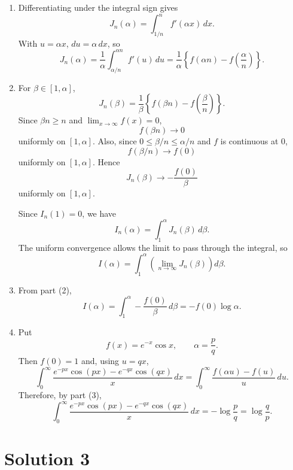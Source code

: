 \documentclass[10pt,a4paper]{article}
\begin{document}
\begin{enumerate}
  \item Differentiating under the integral sign gives
        \[
          J_n(\alpha)
          =
          \int_{1/n}^{n} f'(\alpha x)\,dx.
        \]
        With $u=\alpha x$, $du=\alpha\,dx$, so
        \[
          J_n(\alpha)
          =
          \frac1\alpha
          \int_{\alpha/n}^{\alpha n}f'(u)\,du
          =
          \boxed{
          \frac1\alpha
          \left\{f(\alpha n)-f\left(\frac{\alpha}{n}\right)\right\}.}
        \]

  \item For $\beta\in[1,\alpha]$,
        \[
          J_n(\beta)
          =
          \frac1\beta
          \left\{f(\beta n)-f\left(\frac{\beta}{n}\right)\right\}.
        \]
        Since $\beta n\geq n$ and $\lim_{x\to\infty}f(x)=0$,
        \[
          f(\beta n)\to 0
        \]
        uniformly on $[1,\alpha]$. Also, since $0\leq \beta/n\leq \alpha/n$ and $f$ is continuous at $0$,
        \[
          f(\beta/n)\to f(0)
        \]
        uniformly on $[1,\alpha]$. Hence
        \[
          J_n(\beta)\to -\frac{f(0)}{\beta}
        \]
        uniformly on $[1,\alpha]$.

        Since $I_n(1)=0$, we have
        \[
          I_n(\alpha)=\int_1^\alpha J_n(\beta)\,d\beta.
        \]
        The uniform convergence allows the limit to pass through the integral, so
        \[
          \boxed{
          I(\alpha)=\int_1^\alpha
          \left(\lim_{n\to\infty}J_n(\beta)\right)d\beta.}
        \]

  \item From part (2),
        \[
          I(\alpha)
          =
          \int_1^\alpha -\frac{f(0)}{\beta}\,d\beta
          =
          \boxed{-f(0)\log\alpha.}
        \]

  \item Put
        \[
          f(x)=e^{-x}\cos x,
          \qquad
          \alpha=\frac{p}{q}.
        \]
        Then $f(0)=1$ and, using $u=qx$,
        \[
          \int_0^\infty
          \frac{e^{-px}\cos(px)-e^{-qx}\cos(qx)}{x}\,dx
          =
          \int_0^\infty
          \frac{f(\alpha u)-f(u)}{u}\,du.
        \]
        Therefore, by part (3),
        \[
          \boxed{
          \int_0^\infty
          \frac{e^{-px}\cos(px)-e^{-qx}\cos(qx)}{x}\,dx
          =
          -\log\frac{p}{q}
          =
          \log\frac{q}{p}.}
        \]
\end{enumerate}

\section*{Solution 3}
\end{document}
